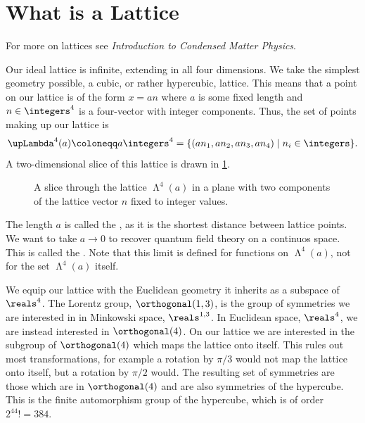 \documentclass[fleqn]{NotesClass}
\newcommand*{\course}[1]{\textit{#1}}
\newcommand{\minkowskiSpace}{\reals^{1,3}}
\newcommand{\lattice}[1][4]{\upLambda^{#1}}
\begin{document}
    \section{What is a Lattice}
    \begin{rmk}
        For more on lattices see \course{Introduction to Condensed Matter Physics}.
    \end{rmk}
    
    Our ideal lattice is infinite, extending in all four dimensions.
    We take the simplest geometry possible, a cubic, or rather hypercubic, lattice.
    This means that a point on our lattice is of the form \(x = an\) where \(a\) is some fixed length and \(n \in \integers^4\) is a four-vector with integer components.
    Thus, the set of points making up our lattice is
    \begin{equation}
        \lattice(a) \coloneqq a\integers^4 = \{(an_1, an_2, an_3, an_4) \mid n_i \in \integers\}.
    \end{equation}
    A two-dimensional slice of this lattice is drawn in \cref{fig:example lattice}.
    
    \begin{figure}
        \caption{A slice through the lattice \(\lattice(a)\) in a plane with two components of the lattice vector \(n\) fixed to integer values.}
        \label{fig:example lattice}
    \end{figure}
    
    The length \(a\) is called the , as it is the shortest distance between lattice points.
    We want to take \(a \to 0\) to recover quantum field theory on a continuos space.
    This is called the .
    Note that this limit is defined for functions on \(\lattice(a)\), not for the set \(\lattice(a)\) itself.
    
    We equip our lattice with the Euclidean geometry it inherits as a subspace of \(\reals^4\).
    The Lorentz group, \(\orthogonal(1, 3)\), is the group of symmetries we are interested in in Minkowski space, \(\minkowskiSpace\).
    In Euclidean space, \(\reals^4\), we are instead interested in \(\orthogonal(4)\).
    On our lattice we are interested in the subgroup of \(\orthogonal(4)\) which maps the lattice onto itself.
    This rules out most transformations, for example a rotation by \(\pi/3\) would not map the lattice onto itself, but a rotation by \(\pi/2\) would.
    The resulting set of symmetries are those which are in \(\orthogonal(4)\) and are also symmetries of the hypercube.
    This is the finite automorphism group of the hypercube, which is of order \(2^44! = 384\).
    
\end{document}
